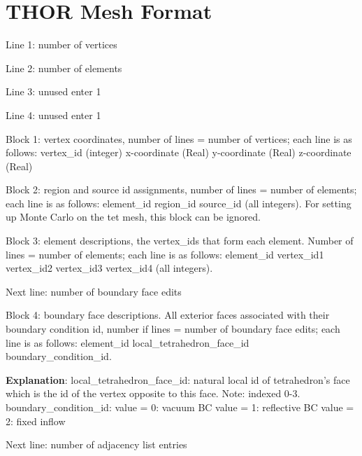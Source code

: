 \section{THOR Mesh Format}\label{ch:inp:sec:meshfile}
Line 1: number of vertices
\vspace{2mm}

\noindent Line 2: number of elements
\vspace{2mm}

\noindent Line 3: unused enter 1
\vspace{2mm}

\noindent Line 4: unused enter 1
\vspace{2mm}

\noindent Block 1: vertex coordinates, number of lines = number of vertices; each line is as follows: vertex\_id (integer) x-coordinate (Real) y-coordinate (Real) z-coordinate (Real)
\vspace{2mm}

\noindent Block 2: region and source id assignments, number of lines = number of elements; each line is as follows: element\_id region\_id source\_id (all integers). For setting up Monte Carlo on the tet mesh, this block can be ignored.
\vspace{2mm}

\noindent Block 3: element descriptions, the vertex\_ids that form each element. Number of lines = number of elements; each line is as follows: element\_id vertex\_id1 vertex\_id2 vertex\_id3 vertex\_id4 (all integers).
\vspace{2mm}

\noindent Next line: number of boundary face edits
\vspace{2mm}

\noindent Block 4: boundary face descriptions. All exterior faces associated with their boundary condition id, number if lines = number of boundary face edits; each line is as follows: element\_id local\_tetrahedron\_face\_id boundary\_condition\_id.
\vspace{2mm}

\noindent \textbf{Explanation}:
local\_tetrahedron\_face\_id: natural local id of tetrahedron’s face which is the id of the vertex opposite to this face. Note: indexed 0-3.
boundary\_condition\_id:
value = 0: vacuum BC
value = 1: reflective BC
value = 2: fixed inflow
\vspace{2mm}

\noindent Next line: number of adjacency list entries
\vspace{2mm}

